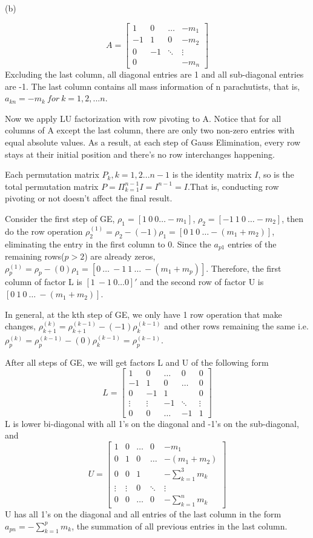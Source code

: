 \documentclass[12pt]{article}
\begin{document}
(b)

\[
A = \begin{bmatrix} 
    1 & 0 & \dots & -m_1\\
    -1& 1 & 0 & -m_2\\
    0 &-1 & \ddots  & \vdots\\
    0 &        &  & -m_n
    \end{bmatrix}
\]
Excluding the last column, all diagonal entries are 1 and all sub-diagonal entries are -1. The last column contains all mass information of n parachutists, that is, $a_{kn} = -m_k\ for\ k = 1,2,...n$.

Now we apply LU factorization with row pivoting to A. Notice that for all columns of A except the last column, there are only two non-zero entries with equal absolute values. As a result, at each step of Gauss Elimination, every row stays at their initial position and there's no row interchanges happening.

Each permutation matrix $P_k, k=1,2...n-1$ is the identity matrix $I$, so is the total permutation matrix $P = \Pi_{k=1}^{n-1} I = I^{n-1} = I$.That is, conducting row pivoting or not doesn't affect the final result.

Consider the first step of GE, $\rho_1 = [1\ 0 \ 0 \dots -m_1]$, $\rho_2 = [-1 \ 1 \ 0 \ \dots -m_2 ]$, then do the row operation $\rho_2^{(1)}  = \rho_2 - (-1)\rho_1 = [0\ 1\ 0\ \dots -(m_1+m_2)]$, eliminating the entry in the first column to 0. Since the $a_{p1}$ entries of the remaining rows($p>2$) are already zeros, $\rho_p^{(1)}  = \rho_p - (0)\rho_1 = [0\ \dots \ -1 \ 1 \ \dots \ -(m_1+m_p)]$. Therefore, the first column of factor L is $[1\ -1\ 0 \dots 0]'$ and the second row of factor U is $[0\ 1\ 0\ \dots \ -(m_1+m_2)]$.

In general, at the kth step of GE, we only have 1 row operation that make changes, $\rho^{(k)}_{k+1} = \rho_{k+1}^{(k-1)}-(-1)\rho_{k}^{(k-1)}$ and other rows remaining the same i.e. $\rho_p^{(k)}  = \rho_p^{(k-1)} - (0)\rho_{k}^{(k-1)} = \rho_p^{(k-1)}$.

After all steps of GE, we will get factors L and U of the following form
\[
L = \begin{bmatrix} 
     1& 0 & \dots & 0 & 0\\
    -1& 1 & 0 & \dots & 0\\
     0&-1 & 1&      &  0\\
\vdots& \vdots &-1& \ddots & \vdots\\
     0& 0 & \dots & -1 & 1
    \end{bmatrix}
\]
L is lower bi-diagonal with all 1's on the diagonal and -1's on the sub-diagonal, and 
\[
U = \begin{bmatrix} 
     1& 0 & \dots & 0 & -m_1\\
     0& 1 & 0 & \dots & -(m_1+m_2)\\
     0& 0 & 1&      &  -\sum_{k = 1}^3 m_k\\
\vdots& \vdots & 0 & \ddots & \vdots\\
     0& 0 & \dots & 0 & -\sum_{k = 1}^n m_k
    \end{bmatrix}
\]
U has all 1's on the diagonal and all entries of the last column in the form $a_{pn} = -\sum_{k=1}^p m_k$, the summation of all previous entries in the last column.
\end{document}
